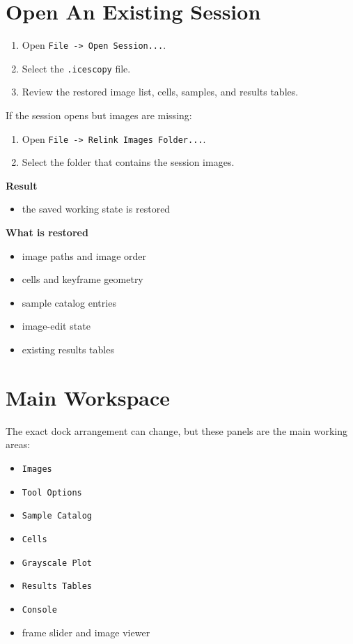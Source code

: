 \documentclass[
  9pt,
  letterpaper,
  oneside,
  open=any,
  DIV=15,
  parskip=half-,
  headings=big,
  numbers=noenddot
]{scrbook}
\newcommand{\manuallead}[1]{%
  \vspace{0.15em}%
  {\sffamily\bfseries\color{ManualBlue}#1}\par\nobreak\vspace{0.05em}%
}
\begin{document}
\section{Open An Existing Session}

\begin{enumerate}[leftmargin=*,itemsep=0.35em,topsep=0.4em]
\item Open \texttt{File -> Open Session...}.
\item Select the \texttt{.icescopy} file.
\item Review the restored image list, cells, samples, and results tables.
\end{enumerate}

If the session opens but images are missing:


\begin{enumerate}[leftmargin=*,itemsep=0.35em,topsep=0.4em]
\item Open \texttt{File -> Relink Images Folder...}.
\item Select the folder that contains the session images.
\end{enumerate}

\manuallead{Result}

\begin{itemize}[leftmargin=*,itemsep=0.35em,topsep=0.4em]
\item the saved working state is restored
\end{itemize}

\manuallead{What is restored}

\begin{itemize}[leftmargin=*,itemsep=0.35em,topsep=0.4em]
\item image paths and image order
\item cells and keyframe geometry
\item sample catalog entries
\item image-edit state
\item existing results tables
\end{itemize}

\section{Main Workspace}

The exact dock arrangement can change, but these panels are the main working areas:


\begin{itemize}[leftmargin=*,itemsep=0.35em,topsep=0.4em]
\item \texttt{Images}
\item \texttt{Tool Options}
\item \texttt{Sample Catalog}
\item \texttt{Cells}
\item \texttt{Grayscale Plot}
\item \texttt{Results Tables}
\item \texttt{Console}
\item frame slider and image viewer
\end{itemize}
\end{document}
